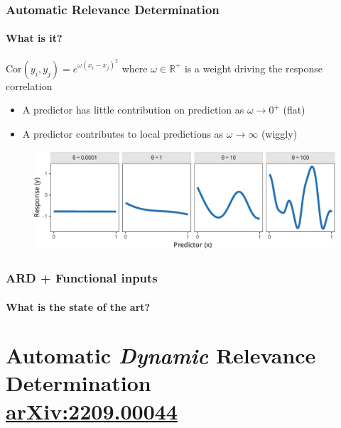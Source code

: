 \documentclass{snedecorbeamer}
\begin{document}
\begin{frame}
  \frametitle{Automatic Relevance Determination\cite{neal1998}}
  \framesubtitle{What is it?}

  $\mathrm{Cor}(y_i, y_j) = e^{\omega {(x_i - x_j)}^2}$
  where $\omega\in\mathbb{R}^+$ is a weight driving the response correlation

  \begin{itemize}
  \item A predictor has little contribution on prediction as $\omega\to0^+$
    (flat)
  \item A predictor contributes to local predictions as $\omega\to\infty$
    (wiggly)
  \end{itemize}

  \begin{figure}
    \centering
    \includegraphics[height=10em]{inc/ard_response_profiles.pdf}
  \end{figure}

\end{frame}

\begin{frame}[c]
  \frametitle{ARD + Functional inputs}
  \framesubtitle{What is the state of the art?}

  

\end{frame}

\section{Automatic \textit{Dynamic} Relevance Determination \\
  {\tiny
    \href{https://doi.org/10.48550/arXiv.2209.00044}{arXiv:2209.00044}}
}
\end{document}
